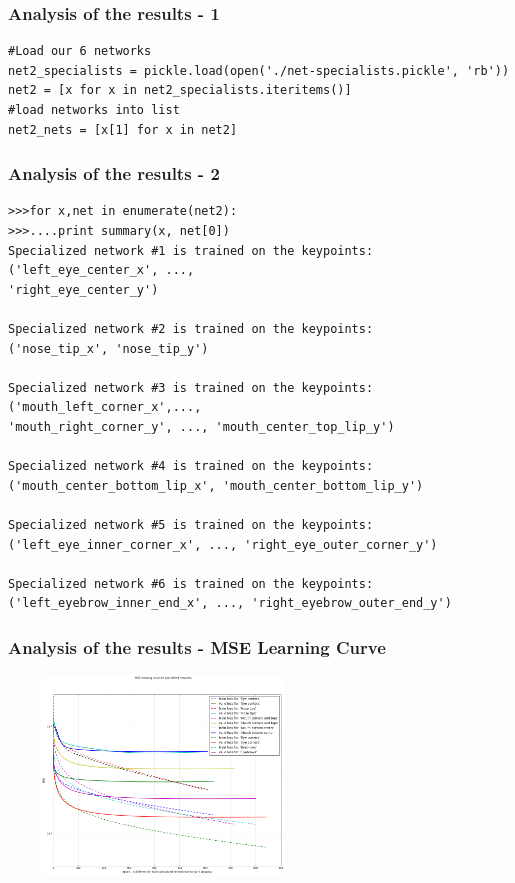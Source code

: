 \documentclass{beamer}
\begin{document}
\begin{frame}[fragile]
\frametitle{Analysis of the results - 1}
\begin{verbatim}
#Load our 6 networks
net2_specialists = pickle.load(open('./net-specialists.pickle', 'rb'))
net2 = [x for x in net2_specialists.iteritems()]
#load networks into list
net2_nets = [x[1] for x in net2]
\end{verbatim}
\end{frame}

\begin{frame}[fragile]
\frametitle{Analysis of the results - 2}
\begin{verbatim}
>>>for x,net in enumerate(net2):
>>>....print summary(x, net[0])
Specialized network #1 is trained on the keypoints:
('left_eye_center_x', ...,
'right_eye_center_y')

Specialized network #2 is trained on the keypoints:
('nose_tip_x', 'nose_tip_y')

Specialized network #3 is trained on the keypoints:
('mouth_left_corner_x',...,
'mouth_right_corner_y', ..., 'mouth_center_top_lip_y')

Specialized network #4 is trained on the keypoints:
('mouth_center_bottom_lip_x', 'mouth_center_bottom_lip_y')

Specialized network #5 is trained on the keypoints:
('left_eye_inner_corner_x', ..., 'right_eye_outer_corner_y')

Specialized network #6 is trained on the keypoints:
('left_eyebrow_inner_end_x', ..., 'right_eyebrow_outer_end_y')
\end{verbatim}
\end{frame}

\begin{frame}
\frametitle{Analysis of the results - MSE Learning Curve}
\includegraphics[width=310px,height=200px]{MSE_learning_curve_specialized_networks.png}
\end{frame}
\end{document}
